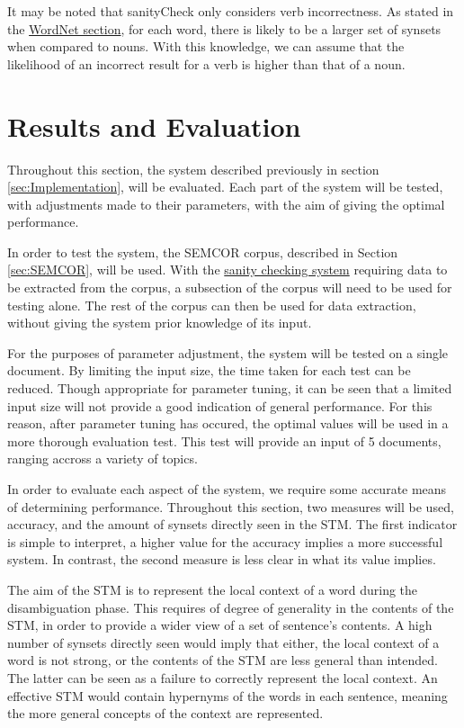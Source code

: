 \documentclass[]{article}
\begin{document}
It may be noted that sanityCheck only considers verb incorrectness. As stated in the \hyperref[Verbs]{WordNet section}, for each word, there is likely to be a larger set of synsets when compared to nouns. With this knowledge, we can assume that the likelihood of an incorrect result for a verb is higher than that of a noun. 



\section{Results and Evaluation}
\label{sec:EvResults}
Throughout this section, the system described previously in section \ref{sec:Implementation}, will be evaluated. Each part of the system will be tested, with adjustments made to their parameters, with the aim of giving the optimal performance. 

In order to test the system, the SEMCOR corpus, described in Section \ref{sec:SEMCOR}, will be used. With the \hyperref[sec:Sanity]{sanity checking system} requiring data to be extracted from the corpus, a subsection of the corpus will need to be used for testing alone. The rest of the corpus can then be used for data extraction, without giving the system prior knowledge of its input.

For the purposes of parameter adjustment, the system will be tested on a single document. By limiting the input size, the time taken for each test can be reduced. Though appropriate for parameter tuning, it can be seen that a limited input size will not provide a good indication of general performance. For this reason, after parameter tuning has occured, the optimal values will be used in a more thorough evaluation test. This test will provide an input of 5 documents, ranging accross a variety of topics. 

In order to evaluate each aspect of the system, we require some accurate means of determining performance. Throughout this section, two measures will be used, accuracy, and the amount of synsets directly seen in the STM. The first indicator is simple to interpret, a higher value for the accuracy implies a more successful system. In contrast, the second measure is less clear in what its value implies.

The aim of the STM is to represent the local context of a word during the disambiguation phase. This requires of degree of generality in the contents of the STM, in order to  provide a wider view of a set of sentence's contents. A high number of synsets directly seen would imply that either, the local context of a word is not strong, or the contents of the STM are less general than intended. The latter can be seen as a failure to correctly represent the local context. An effective STM would contain hypernyms of the words in each sentence, meaning the more general concepts of the context are represented.
\end{document}
